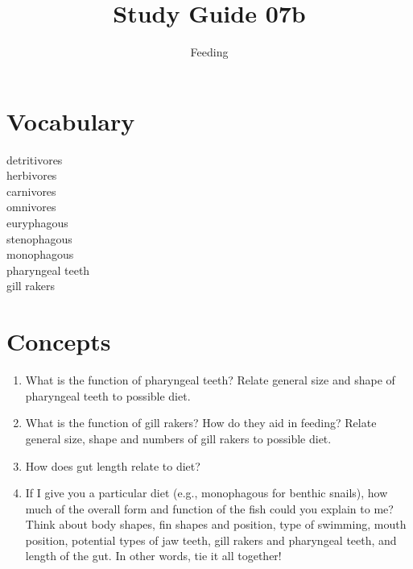 \documentclass[nofonts, letterpaper]{tufte-handout}
\title{Study Guide 07b}
\author{Feeding}
\date{} %
\begin{document}
\maketitle	%


\section{Vocabulary} 
\vspace{-1\baselineskip}
\begin{multicols}{2}
detritivores \\
herbivores \\
carnivores \\
omnivores \\
euryphagous \\
stenophagous \\
monophagous \\
pharyngeal teeth \\
gill rakers 
\end{multicols}

\section{Concepts}

\begin{enumerate}
	\item What is the function of pharyngeal teeth?  Relate general size and shape of pharyngeal teeth to possible diet.

	\item What is the function of gill rakers?  How do they aid in feeding?  Relate general size, shape and numbers of gill rakers to possible diet.

	\item How does gut length relate to diet?

	\item If I give you a particular diet (e.g., monophagous for benthic snails), how much of the overall form and function of the fish could you explain to me?  Think about body shapes, fin shapes and position, type of swimming, mouth position, potential types of jaw teeth, gill rakers and pharyngeal teeth, and length of the gut.  In other words, tie it all together!
\end{enumerate}
\end{document}

